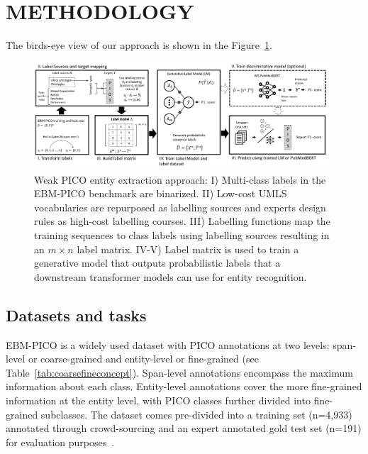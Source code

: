 \documentclass[10.7pt,]{article}
\begin{document}
\section{METHODOLOGY}\label{methods}
%
The birds-eye view of our approach is shown in the Figure~\ref{fig:approach}.
%
\begin{figure}[ht]
\centering
\includegraphics[width=0.98\textwidth]{figures/approach.pdf}
\caption{Weak PICO entity extraction approach: I) Multi-class labels in the EBM-PICO benchmark are binarized. II) Low-cost UMLS vocabularies are repurposed as labelling sources and experts design rules as high-cost labelling courses. III) Labelling functions map the training sequences to class labels using labelling sources resulting in an $m \times n$ label matrix. IV-V) Label matrix is used to train a generative model that outputs probabilistic labels that a downstream transformer models can use for entity recognition.}
\label{fig:approach}
\end{figure}
%
%
%
\subsection{Datasets and tasks}\label{data}
%
EBM-PICO is a widely used dataset with PICO annotations at two levels: span-level or coarse-grained and entity-level or fine-grained (see Table~\ref{tab:coarsefineconcept}).
Span-level annotations encompass the maximum information about each class.
Entity-level annotations cover the more fine-grained information at the entity level, with PICO classes further divided into fine-grained subclasses.
The dataset comes pre-divided into a training set (n=4,933) annotated through crowd-sourcing and an expert annotated gold test set (n=191) for evaluation purposes~\cite{nye2018corpus}.
\end{document}
